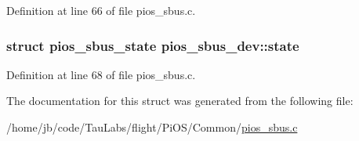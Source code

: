 \-Definition at line 66 of file pios\-\_\-sbus.\-c.

\hypertarget{structpios__sbus__dev_aeddc0c60e673c21f9c666cc8134935ee}{
\subsubsection[{state}]{\setlength{\rightskip}{0pt plus 5cm}struct {\bf pios\-\_\-sbus\-\_\-state} {\bf pios\-\_\-sbus\-\_\-dev\-::state}}}\label{structpios__sbus__dev_aeddc0c60e673c21f9c666cc8134935ee}


\-Definition at line 68 of file pios\-\_\-sbus.\-c.



\-The documentation for this struct was generated from the following file\-:\begin{DoxyCompactItemize}
\item 
/home/jb/code/\-Tau\-Labs/flight/\-Pi\-O\-S/\-Common/\hyperlink{pios__sbus_8c}{pios\-\_\-sbus.\-c}\end{DoxyCompactItemize}
